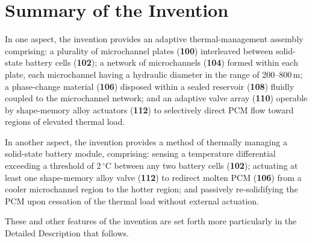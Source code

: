 \section{Summary of the Invention}

In one aspect, the invention provides an adaptive thermal-management assembly comprising: a
plurality of microchannel plates (\textbf{100}) interleaved between solid-state battery
cells (\textbf{102}); a network of microchannels (\textbf{104}) formed within each plate,
each microchannel having a hydraulic diameter in the range of 200--800\,\textmu m; a
phase-change material (\textbf{106}) disposed within a sealed reservoir (\textbf{108})
fluidly coupled to the microchannel network; and an adaptive valve array (\textbf{110})
operable by shape-memory alloy actuators (\textbf{112}) to selectively direct PCM flow
toward regions of elevated thermal load.

In another aspect, the invention provides a method of thermally managing a solid-state
battery module, comprising: sensing a temperature differential exceeding a threshold of
$2\,^{\circ}\mathrm{C}$ between any two battery cells (\textbf{102}); actuating at least one
shape-memory alloy valve (\textbf{112}) to redirect molten PCM (\textbf{106}) from a cooler
microchannel region to the hotter region; and passively re-solidifying the PCM upon
cessation of the thermal load without external actuation.

These and other features of the invention are set forth more particularly in the Detailed
Description that follows.

